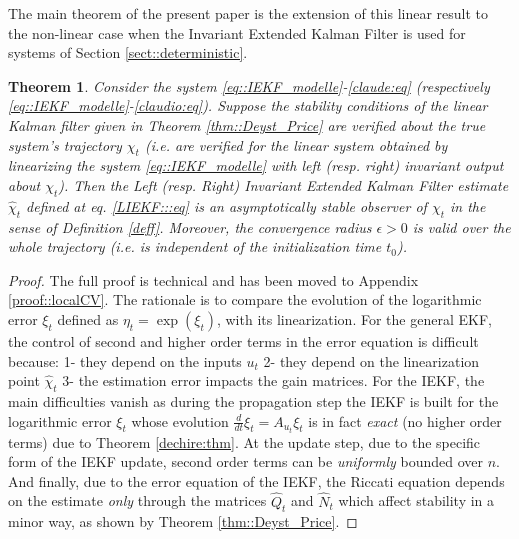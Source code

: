 \documentclass[a4paper,12pt,onecolumn]{article}
\newtheorem{thm}{Theorem}
\begin{document}
The main theorem of the present paper is the extension of this linear result to the non-linear case when the Invariant Extended Kalman Filter is used for systems of Section \ref{sect::deterministic}.
\begin{thm}
\label{thm::localCV}
Consider the system \eqref{eq::IEKF_modelle}-\eqref{claude:eq} (respectively  \eqref{eq::IEKF_modelle}-\eqref{claudio:eq}). Suppose the stability conditions of the linear Kalman filter given in Theorem \ref{thm::Deyst_Price} are verified  about the \emph{true} system's trajectory $\chi_t$ (i.e. are verified for the linear system obtained by linearizing the system \eqref{eq::IEKF_modelle} with left (resp. right) invariant output about $\chi_t$). Then the Left (resp. Right) Invariant Extended Kalman Filter  estimate $\hat{\chi}_t$ defined at eq. \eqref{LIEKF:::eq} is an asymptotically stable observer of $\chi_t$ in the sense of Definition \ref{deff}. Moreover, the convergence radius $\epsilon>0$ is valid over the whole trajectory (i.e. is independent of the initialization time $t_0$).
\end{thm}
\begin{proof}
The full proof is technical and has been moved to Appendix \ref{proof::localCV}.  The rationale is to compare the evolution of the logarithmic error $\xi_t$ defined as $\eta_t = \exp(\xi_t)$, with its linearization. For the general EKF, the control of second and higher order terms in the error equation is difficult because: 1- they depend on the inputs $u_t$ 2- they depend on the linearization point $\hat{\chi}_t$ 3- the estimation error impacts the gain matrices. 
For the IEKF, the main difficulties vanish as during the propagation step the IEKF is built for the  logarithmic error $\xi_t$ whose evolution $\frac{d}{dt} \xi_t  = A_{u_t} \xi_t$ is in fact \emph{exact}  (no higher order terms) due to  Theorem \ref{dechire:thm}. At the update step, due to the specific form of the IEKF update, second order terms can be \emph{uniformly}  bounded over $n$. And finally, due to the error equation of the IEKF, the Riccati equation depends on the estimate \emph{only} through the  matrices $\hat{Q}_t$ and $\hat{N}_t$ which affect stability in a minor way, as shown by  Theorem \ref{thm::Deyst_Price}.



\end{proof}
\end{document}
